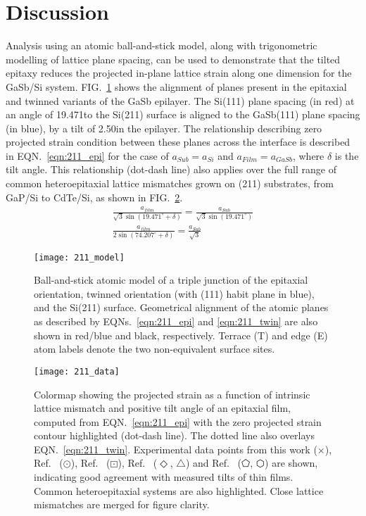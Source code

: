 \section{Discussion}
Analysis using an atomic ball-and-stick model, along with trigonometric modelling of lattice plane spacing, can be used to demonstrate that the tilted epitaxy reduces the projected in-plane lattice strain along one dimension for the GaSb/Si system. FIG.~\ref{fig:211_model} shows the alignment of planes present in the epitaxial and twinned variants of the GaSb epilayer. The Si(111) plane spacing (in red) at an angle of 19.471\degree to the Si(211) surface is aligned to the GaSb(111) plane spacing (in blue), by a tilt of 2.50\degree in the epilayer. The relationship describing zero projected strain condition between these planes across the interface is described in EQN.~\ref{eqn:211_epi} for the case of $a_{Sub} = a_{Si}$ and $a_{Film} = a_{GaSb}$, where $\delta$ is the tilt angle. This relationship (dot-dash line) also applies over the full range of common heteroepitaxial lattice mismatches grown on (211) substrates, from GaP/Si to CdTe/Si, as shown in FIG.~\ref{fig:211_data}.
\begin{gather} 
 \frac{ a_{film}}{\sqrt{3} \sin(19.471^\circ + \delta)} = \frac{a_{Sub}}{\sqrt{3}\sin(19.471^\circ)} \label{eqn:211_epi}\\
 \frac{ a_{film}}{2\sin(74.207^\circ + \delta)} = \frac{ a_{Sub}}{\sqrt{3}}   \label{eqn:211_twin}
\end{gather}
\begin{figure}
\texttt{[image: 211\_model]}
\caption{\label{fig:211_model}Ball-and-stick atomic model of a triple junction of the epitaxial orientation, twinned orientation (with (111) habit plane in blue), and the Si(211) surface. Geometrical alignment of the atomic planes as described by EQNs.~\ref{eqn:211_epi} and \ref{eqn:211_twin} are also shown in red/blue and black, respectively. Terrace (T) and edge (E) atom labels denote the two non-equivalent surface sites.}	
\end{figure}
\begin{figure}
\texttt{[image: 211\_data]}
\caption{\label{fig:211_data}Colormap showing the projected strain as a function of intrinsic lattice mismatch and positive tilt angle of an epitaxial film, computed from EQN.~\ref{eqn:211_epi} with the zero projected strain contour highlighted (dot-dash line). The dotted line also overlays EQN.~\ref{eqn:211_twin}. Experimental data points from this work ($\times$), Ref.~ ($\odot$), Ref.~ ($\boxdot$), Ref.~ ($\Diamond$, $\bigtriangleup$) and Ref.~ ($\pentagon$, $\varhexagon$) are shown, indicating good agreement with measured tilts of thin films. Common heteroepitaxial systems are also highlighted. Close lattice mismatches are merged for figure clarity.}
\end{figure}
